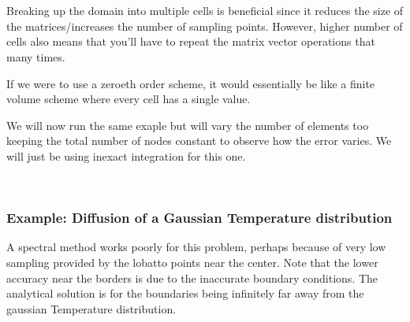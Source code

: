 \documentclass[11pt]{article}
\begin{document}
    \begin{center}
    \end{center}
    { \hspace*{\fill} \\}
    

    \begin{center}
    \end{center}
    { \hspace*{\fill} \\}
    
    Breaking up the domain into multiple cells is beneficial since it
reduces the size of the matrices/increases the number of sampling
points. However, higher number of cells also means that you'll have to
repeat the matrix vector operations that many times.

If we were to use a zeroeth order scheme, it would essentially be like a
finite volume scheme where every cell has a single value.

We will now run the same exaple but will vary the number of elements too
keeping the total number of nodes constant to observe how the error
varies. We will just be using inexact integration for this one.


    \begin{center}
    \end{center}
    { \hspace*{\fill} \\}
    
    \subsubsection{Example: Diffusion of a Gaussian Temperature
distribution}\label{example-diffusion-of-a-gaussian-temperature-distribution}

A spectral method works poorly for this problem, perhaps because of very
low sampling provided by the lobatto points near the center. Note that
the lower accuracy near the borders is due to the inaccurate boundary
conditions. The analytical solution is for the boundaries being
infinitely far away from the gaussian Temperature distribution.
\end{document}
